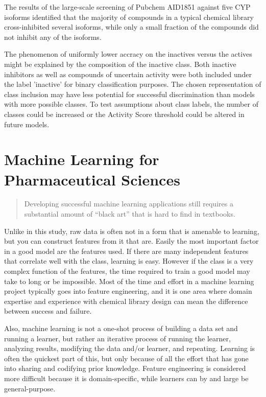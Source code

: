 The results of the large-scale screening of Pubchem AID1851 against five CYP isoforms identified that the majority of compounds in a typical chemical library cross-inhibited several isoforms, while only a small fraction of the compounds did not inhibit any of the isoforms. \cite{Veith2009}

The phenomenon of uniformly lower accracy on the inactives versus the actives might be explained by the composition of the inactive class. Both inactive inhibitors as well as compounds of uncertain activity were both included under the label 'inactive' for binary classification purposes. The chosen representation of class inclusion may have less potential for successful discrimination than models with more possible classes. To test assumptions about class labels, the number of classes could be increased or the Activity Score threshold could be altered in future models.


\section{Machine Learning for Pharmaceutical Sciences}
\begin{quote}
Developing successful machine learning applications still requires a substantial amount of “black art” that is hard to find in textbooks. \cite{Domingos2012}
\end{quote}

Unlike in this study, raw data is often not in a form that is amenable to learning, but you can construct features from it that are. Easily the most important factor in a good model are the features used. If there are many independent features that correlate well with the class, learning is easy. However if the class is a very complex function of the features, the time required to train a good model may take to long or be impossible. \cite{Domingos2012} Most of the time and effort in a machine learning project typically goes into feature engineering, and it is one area where domain expertise and experience with chemical library design can mean the difference between success and failure.

Also, machine learning is not a one-shot process of building a data set and running a learner, but rather an iterative process of running the learner, analyzing results, modifying the data and/or learner, and repeating. Learning is often the quickest part of this, but only because of all the  effort that has gone into sharing and codifying prior knowledge. Feature engineering is considered more difficult because it is domain-specific, while learners can by and large be general-purpose. \cite{Domingos2012}

